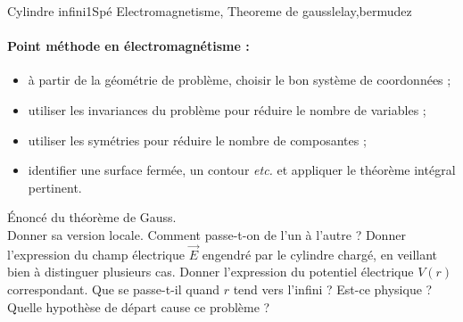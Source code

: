 \begin{exercise}{Cylindre infini}{1}{Spé}
{Electromagnetisme, Theoreme de gauss}{lelay,bermudez}

\paragraph{Point méthode en électromagnétisme :}
\begin{itemize}
    \item à partir de la géométrie de problème, choisir le bon système de coordonnées ;
    \item utiliser les invariances du problème pour réduire le nombre de variables ;
    \item utiliser les symétries pour réduire le nombre de composantes ;
    \item identifier une surface fermée, un contour \emph{etc.} et appliquer le théorème intégral pertinent.
\end{itemize}

\begin{questions}
    \questioncours Énoncé du théorème de Gauss. \\
    Donner sa version locale. Comment passe-t-on de l'un à l'autre ?
    \question Donner l'expression du champ électrique $\vec{E}$ engendré par le cylindre chargé, en veillant bien à distinguer plusieurs cas.
    \question Donner l'expression du potentiel électrique $V(r)$ correspondant. Que se passe-t-il quand $r$ tend vers l'infini ? Est-ce physique ? Quelle hypothèse de départ cause ce problème ?
								  
\end{questions}

\end{exercise}



